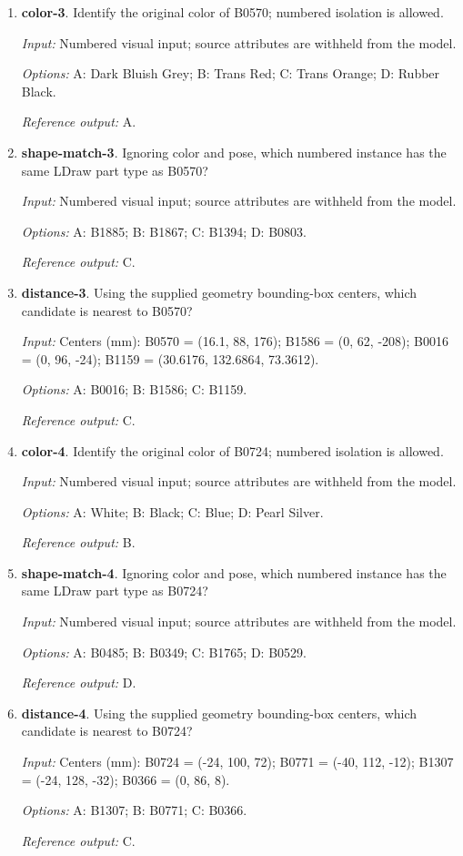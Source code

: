 \begin{enumerate}
\item \textbf{color-3}. Identify the original color of B0570; numbered isolation is allowed.\par {\small \textit{Input:} Numbered visual input; source attributes are withheld from the model. \par\textit{Options:} A: Dark Bluish Grey; B: Trans Red; C: Trans Orange; D: Rubber Black. \par\textit{Reference output:} A.}
\item \textbf{shape-match-3}. Ignoring color and pose, which numbered instance has the same LDraw part type as B0570?\par {\small \textit{Input:} Numbered visual input; source attributes are withheld from the model. \par\textit{Options:} A: B1885; B: B1867; C: B1394; D: B0803. \par\textit{Reference output:} C.}
\item \textbf{distance-3}. Using the supplied geometry bounding-box centers, which candidate is nearest to B0570?\par {\small \textit{Input:} Centers (mm): B0570 = (16.1, 88, 176); B1586 = (0, 62, -208); B0016 = (0, 96, -24); B1159 = (30.6176, 132.6864, 73.3612). \par\textit{Options:} A: B0016; B: B1586; C: B1159. \par\textit{Reference output:} C.}
\item \textbf{color-4}. Identify the original color of B0724; numbered isolation is allowed.\par {\small \textit{Input:} Numbered visual input; source attributes are withheld from the model. \par\textit{Options:} A: White; B: Black; C: Blue; D: Pearl Silver. \par\textit{Reference output:} B.}
\item \textbf{shape-match-4}. Ignoring color and pose, which numbered instance has the same LDraw part type as B0724?\par {\small \textit{Input:} Numbered visual input; source attributes are withheld from the model. \par\textit{Options:} A: B0485; B: B0349; C: B1765; D: B0529. \par\textit{Reference output:} D.}
\item \textbf{distance-4}. Using the supplied geometry bounding-box centers, which candidate is nearest to B0724?\par {\small \textit{Input:} Centers (mm): B0724 = (-24, 100, 72); B0771 = (-40, 112, -12); B1307 = (-24, 128, -32); B0366 = (0, 86, 8). \par\textit{Options:} A: B1307; B: B0771; C: B0366. \par\textit{Reference output:} C.}

\end{enumerate}
